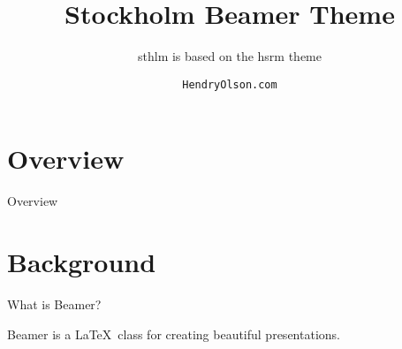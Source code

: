 \documentclass[compress]{beamer}
\title{Stockholm Beamer Theme}
\subtitle{sthlm is based on the hsrm theme}
\date{\small{\jobname}}
\author{\texttt{HendryOlson.com}}
\institute{Made in \textit{Sweden}}
\begin{document}
%
%

\maketitle


%
%

\section*{Overview}
\begin{frame}{Overview}
\tableofcontents[hideallsubsections]
\end{frame}

%
%

\section{Background}


\begin{frame}{What is Beamer?}

\centerline {Beamer is a \LaTeX\ class for creating beautiful presentations.}  
\end{frame}


%
%
\end{document}
